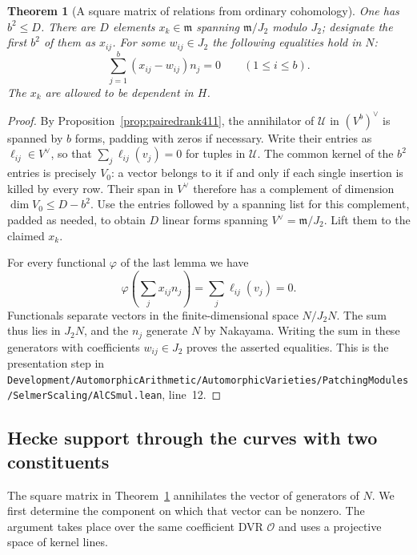 \documentclass[a4paper,11pt]{article}
\newtheorem{theorem}[proposition]{Theorem}
\theoremstyle{definition}
\theoremstyle{remark}
\newcommand{\srcloc}[2]{{\small\nolinkurl{#1.lean}}, line~#2}
\numberwithin{equation}{section}
\begin{document}
\begin{theorem}[A square matrix of relations from ordinary cohomology]\leavevmode
\label{thm:oddrelations411}
One has \(b^2\le D\). There are \(D\) elements \(x_k\in\mathfrak m\)
spanning \(\mathfrak m/J_2\) modulo \(J_2\); designate the
first \(b^2\) of them as \(x_{ij}\). For some \(w_{ij}\in J_2\)
the following equalities hold in \(N\):
\[
                 \sum_{j=1}^b(x_{ij}-w_{ij}) n_j=0
                         \qquad(1\le i\le b).
\]
The \(x_k\) are allowed to be dependent in \(H\).
\end{theorem}
\begin{proof}
By Proposition~\ref{prop:pairedrank411}, the annihilator of
\(\mathcal U\) in \((V^b)^\vee\) is spanned by \(b\) forms,
padding with zeros if necessary. Write their entries as
\(\ell_{ij}\in V^\vee\), so that
\(\sum_j\ell_{ij}(v_j)=0\) for tuples in \(\mathcal U\).
The common kernel of the \(b^2\) entries is precisely
\(V_0\): a vector belongs to it if and only if each single
insertion is killed by every row. Their span in \(V^\vee\)
therefore has a complement of dimension \(\dim V_0\le D-b^2\).
Use the entries followed by a spanning list for this
complement, padded as needed, to obtain \(D\) linear forms
spanning \(V^\vee=\mathfrak m/J_2\). Lift them to the
claimed \(x_k\).

For every functional \(\varphi\) of the last lemma we have
\[
  \varphi\!\left(\sum_j x_{ij}n_j\right)
          =\sum_j\ell_{ij}(v_j)=0 .
\]
Functionals separate vectors in the finite-dimensional
space \(N/J_2N\). The sum thus lies in \(J_2 N\), and the
\(n_j\) generate \(N\) by Nakayama. Writing the sum in
these generators with coefficients \(w_{ij}\in J_2\)
proves the asserted equalities. This is the presentation
step in \srcloc{Development/AutomorphicArithmetic/AutomorphicVarieties/PatchingModules/SelmerScaling/AlCSmul}{12}.
\end{proof}


\subsection{Hecke support through the curves with two constituents}
\label{sec:reduciblepropagation412}

The square matrix in Theorem~\ref{thm:oddrelations411}
annihilates the vector of generators of \(N\). We first
determine the component on which that vector can be nonzero.
The argument takes place over the same coefficient DVR
\(\mathcal O\) and uses a projective space of kernel lines.
\end{document}
